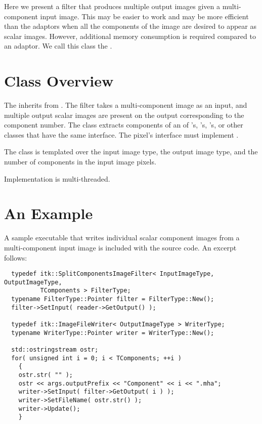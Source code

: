 \documentclass{InsightArticle}
\begin{document}
Here we present a filter that produces multiple output images given a
multi-component input image.  This may be easier to work and may be more efficient
than the adaptors when all the components of the image are desired to appear as
scalar images.  However, additional memory consumption is required compared to
an adaptor.  We call this class the .

\section{Class Overview}

The  inherits from
.  The filter takes a multi-component image as an
input, and multiple output scalar images are present on the output corresponding
to the component number.  The class extracts components of an  of
's, 's,
's, or other classes that have the same
interface.  The pixel's interface must implement .

The class is templated over the input image type, the output image type, and the
number of components in the input image pixels.

Implementation is multi-threaded.

\section{An Example}

A sample executable that writes individual scalar component images from a
multi-component input image is included with the source code.  An excerpt
follows:

\begin{verbatim}
  typedef itk::SplitComponentsImageFilter< InputImageType, OutputImageType,
          TComponents > FilterType;
  typename FilterType::Pointer filter = FilterType::New();
  filter->SetInput( reader->GetOutput() );

  typedef itk::ImageFileWriter< OutputImageType > WriterType;
  typename WriterType::Pointer writer = WriterType::New();

  std::ostringstream ostr;
  for( unsigned int i = 0; i < TComponents; ++i )
    {
    ostr.str( "" );
    ostr << args.outputPrefix << "Component" << i << ".mha";
    writer->SetInput( filter->GetOutput( i ) );
    writer->SetFileName( ostr.str() );
    writer->Update();
    }
\end{verbatim}
\end{document}
